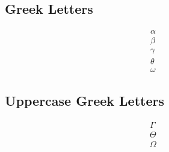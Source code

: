 \documentclass{article}
\begin{document}
\subsection{Greek Letters}

\begin{align*}
    \alpha & \\
    \beta & \\
    \gamma & \\
    \theta & \\
    \omega &
\end{align*}

\subsection{Uppercase Greek Letters}

\begin{align*}
    \Gamma & \\
    \Theta & \\
    \Omega &
\end{align*}
\end{document}
